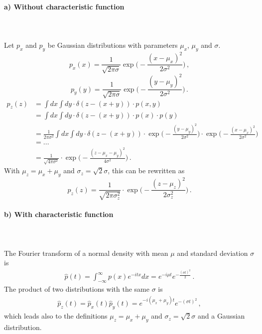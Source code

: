 \paragraph{a) Without characteristic function} \ \\ 
\\
Let $p_x$ and $p_y$ be Gaussian distributions with 
parameters $\mu_x$, $\mu_y$ and $\sigma$.
\begin{equation}
    p_x(x)=\frac{1}{\sqrt{2\pi\sigma}}
    \exp\bigg(-\frac{(x-\mu_x)^2}{2\sigma^2}\bigg) \,,
\end{equation}
\begin{equation}
    p_y(y)=\frac{1}{\sqrt{2\pi\sigma}}
    \exp\bigg(-\frac{(y-\mu_y)^2}{2\sigma^2}\bigg) \,.
\end{equation}
\begin{align}
    p_z(z)
    &=\int dx\int dy\cdot\delta(z-(x+y))\cdot p(x,y) \\
    &=\int dx\int dy\cdot\delta(z-(x+y))\cdot p(x)\cdot p(y) \\
    &=\frac{1}{2\pi\sigma^2}\int dx\int dy\cdot
    \delta(z-(x+y))\cdot
    \exp\bigg(-\frac{(y-\mu_y)^2}{2\sigma^2}\bigg)\cdot
    \exp\bigg(-\frac{(x-\mu_x)^2}{2\sigma^2}\bigg) \\
    &= ... \\
    &=\frac{1}{\sqrt{4\pi\sigma^2}}\cdot
    \exp\bigg(-\frac{(z-\mu_x-\mu_y)^2}{4\sigma^2}\bigg) \,.
\end{align}
With $\mu_z=\mu_x+\mu_y$
and $\sigma_z=\sqrt{2} \sigma$, this can be 
rewritten as
\begin{equation}
    p_z(z)
    =\frac{1}{\sqrt{2\pi\sigma_z^2}}\cdot
    \exp\bigg(-\frac{(z-\mu_z)^2}{2\sigma_z^2}\bigg) \,.
\end{equation}

\paragraph{b) With characteristic function} \ \\
\\
The Fourier transform of a normal density with mean $\mu$ and standard deviation $\sigma$ is
\begin{align}
\hat{p}(t) = \int_{-\infty}^{\infty} p(x) e^{-itx} dx = e^{-i\mu t} e^{-\frac{(\sigma t)^2}{2}} \,.
\end{align}
The product of two distributions with the same $\sigma$ is
\begin{align}
\hat{p}_z(t) = \hat{p}_x(t)\hat{p}_y(t) = e^{-i(\mu_x+\mu_y) t} e^{-(\sigma t)^2} \,,
\end{align}
which leads also to the definitions $\mu_z=\mu_x+\mu_y$
and $\sigma_z=\sqrt{2} \sigma$ and a Gaussian distribution.